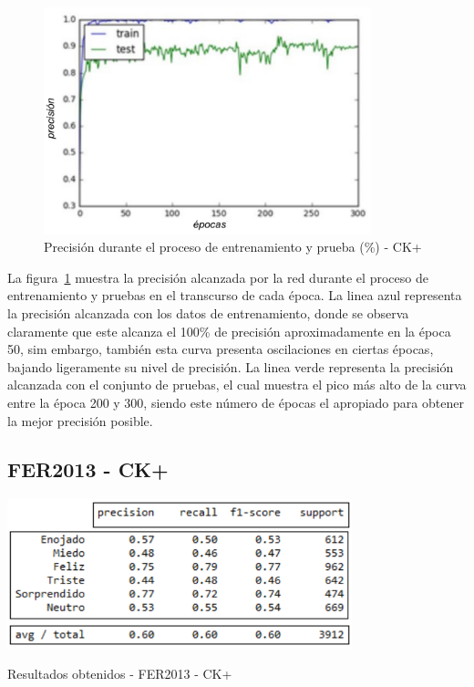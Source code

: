 \begin{figure}[H]
		\centering
		\includegraphics[width=95mm]{Imagenes/precision_ck+.pdf}
		\caption{Precisión durante el proceso de entrenamiento y prueba (\%) - CK+}
		\label{fig:precision-ck+}
\end{figure}

La figura~\ref{fig:precision-ck+} muestra la precisión alcanzada por la red durante el proceso de entrenamiento y pruebas en el transcurso de cada época. La linea azul representa la precisión alcanzada con los datos de entrenamiento, donde se observa claramente que este alcanza el 100\% de precisión aproximadamente en la época 50, sim embargo, también esta curva presenta oscilaciones en ciertas épocas, bajando ligeramente su nivel de precisión. La linea verde representa la precisión alcanzada con el conjunto de pruebas, el cual muestra el pico más alto de la curva entre la época 200 y 300, siendo este número de épocas el apropiado para obtener la mejor precisión posible.

\subsection{FER2013 - CK+}

\begin{table}[H]
    \centering
    \includegraphics[width=100mm]{Imagenes/tabla_resultados_fer_ck+.png} 
    \caption{Resultados obtenidos - FER2013 - CK+}
    \label{tab:tabla_resultados_fer_ck+}
\end{table}

